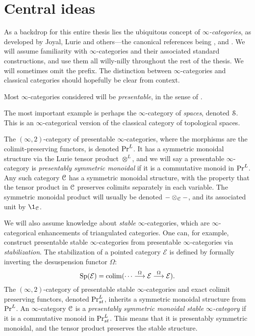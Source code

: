 
\section{Central ideas}
\label{ch0:sec:Central-ideas}

As a backdrop for this entire thesis lies the ubiquitous concept of \emph{$\infty$-categories}, as developed by Joyal, Lurie and others---the canonical references being \cite{joyal_02}, \cite{lurie_09} and \cite{Lurie_HA}. We will assume familiarity with $\infty$-categories and their associated standard constructions, and use them all willy-nilly throughout the rest of the thesis. We will sometimes omit the prefix. The distinction between $\infty$-categories and classical categories should hopefully be clear from context.  

Most $\infty$-categories considered will be \emph{presentable}, in the sense of \cite[Chapter 5]{lurie_09}. 

\begin{example}
    The most important example is perhaps the $\infty$-category of \emph{spaces}, denoted $\EuScript{S}$. This is an $\infty$-categorical version of the classical category of topological spaces. 
\end{example}

The $(\infty, 2)$-category of presentable $\infty$-categories, where the morphisms are the colimit-preserving functors, is denoted $\mathrm{Pr}^L$. It has a symmetric monoidal structure via the Lurie tensor product $\otimes^L$, and we will say a presentable $\infty$-category is \emph{presentably symmetric monoidal} if it is a commutative monoid in $\mathrm{Pr}^L$. Any such category $\EuScript{C}$ has a symmetric monoidal structure, with the property that the tensor product in $\EuScript{C}$ preserves colimits separately in each variable. The symmetric monoidal product will usually be denoted $-\otimes_{\EuScript{C}} -$, and its associated unit by $\1_\C$. 

We will also assume knowledge about \emph{stable} $\infty$-categories, which are $\infty$-categorical enhancements of triangulated categories. One can, for example, construct presentable stable $\infty$-categories from presentable $\infty$-categories via \emph{stabilization}. The stabilization of a pointed category $\mathcal{E}$ is defined by formally inverting the desuspension functor $\Omega$:
\[\mathrm{Sp}(\mathcal{E}) = \operatorname{colim} (\cdots\overset{\Omega}{\longrightarrow}\mathcal{E}\overset{\Omega}{\longrightarrow}\mathcal{E}).\] 
The $(\infty, 2)$-category of presentable stable $\infty$-categories and exact colimit preserving functors, denoted $\mathrm{Pr}_{st}^L$, inherits a symmetric monoidal structure from $\mathrm{Pr}^L$. An $\infty$-category $\EuScript{C}$ is a \emph{presentably symmetric monoidal stable $\infty$-category} if it is a commutative monoid in $\mathrm{Pr}_{st}^L$. This means that it is presentably symmetric monoidal, and the tensor product preserves the stable structure. 

